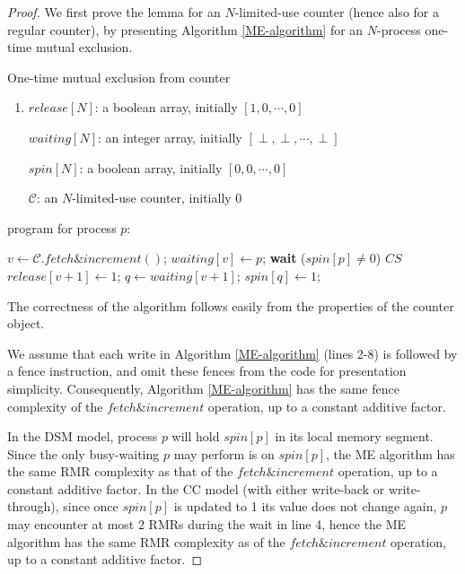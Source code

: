 	\begin{proof}
		We first prove the lemma for an $N$-limited-use counter (hence also for a regular counter), by presenting Algorithm \ref{ME-algorithm} for an $N$-process one-time mutual exclusion.
		
		\begin{algorithm}[b]
			\caption{One-time mutual exclusion from counter}
			\label{ME-algorithm}
			\begin{enumerate}
				\parskip0pt
				\item $release[N]$: a boolean array, initially $[1,0,\cdots,0]$
				
				$waiting[N]$: an integer array, initially $[\perp,\perp,\cdots,\perp]$
				
				$spin[N]$: a boolean array, initially $[0,0,\cdots,0]$
				
				$\mathcal{C}$: an $N$-limited-use counter, initially 0
			\end{enumerate}
			
			program for process $p$:
			\begin{algorithmic}[1]
				\State $v \leftarrow \mathcal{C}.fetch \& increment()$;
				\State $waiting[v] \leftarrow p$;
				\State \textbf{wait} ($spin[p] \neq 0$)
				\EndIf
				\Statex $CS$
				\State $release[v+1] \leftarrow 1$;
				\State $q \leftarrow waiting[v+1]$;
				\State $spin[q] \leftarrow 1$;
				\EndIf
			\end{algorithmic}
		\end{algorithm}
		
		The correctness of the algorithm follows easily from the properties of the counter object.
		
		We assume that each write in Algorithm \ref{ME-algorithm} (lines 2-8) is followed by a fence instruction, and omit these fences from the code for presentation simplicity. Consequently, Algorithm \ref{ME-algorithm} has the same fence complexity of the $fetch\&increment$ operation, up to a constant additive factor.
		
		In the DSM model, process $p$ will hold $spin[p]$ in its local memory segment. Since the only busy-waiting $p$ may perform is on $spin[p]$, the ME algorithm has the same RMR complexity as that of the $fetch\&increment$ operation, up to a constant additive factor. In the CC model (with either write-back or write-through), since once $spin[p]$ is updated to 1 its value does not change again, $p$ may encounter at most 2 RMRs during the wait in line 4, hence the ME algorithm has the same RMR complexity as of the $fetch\&increment$ operation, up to a constant additive factor.
		

\end{proof}
